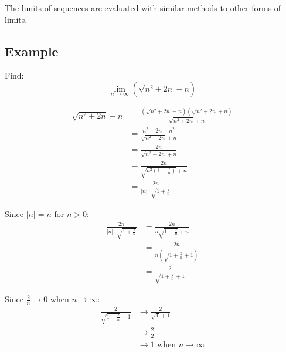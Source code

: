 \documentclass[11pt]{article}
\begin{document}
The limits of sequences are evaluated with similar methods to other forms of limits.

\newpage

\subsection{Example}
\label{sec:orgae72cb1}
Find:
\[\lim_{n \rightarrow \infty} (\sqrt{n^2 + 2n} - n)\]

\begin{align*}
\sqrt{n^2 + 2n} - n &= \frac{(\sqrt{n^2 + 2n} - n)(\sqrt{n^2 + 2n} + n)}{\sqrt{n^2 + 2n} + n} \\
&= \frac{n^2 + 2n - n^2}{\sqrt{n^2 + 2n} + n} \\
&= \frac{2n}{\sqrt{n^2 + 2n} + n} \\
&= \frac{2n}{\sqrt{n^2 \left( 1 + \frac{2}{n} \right)} + n} \\
&= \frac{2n}{|n| \cdot \sqrt{1 + \frac{2}{n}}}
\end{align*}

Since \(|n| = n\) for \(n > 0\):
\begin{align*}
\frac{2n}{|n| \cdot \sqrt{1 + \frac{2}{n}}} &= \frac{2n}{n \sqrt{1 + \frac{2}{n}} + n} \\
&= \frac{2n}{n (\sqrt{1 + \frac{2}{n}} + 1)} \\
&= \frac{2}{\sqrt{1 + \frac{2}{n}} + 1}
\end{align*}

Since \(\frac{2}{n} \rightarrow 0\) when \(n \rightarrow \infty\):
\begin{align*}
\frac{2}{\sqrt{1 + \frac{2}{n}} + 1} &\rightarrow \frac{2}{\sqrt{1} + 1} \\
&\rightarrow \frac{2}{2} \\
&\rightarrow 1 \text{ when } n \rightarrow \infty
\end{align*}
\end{document}
